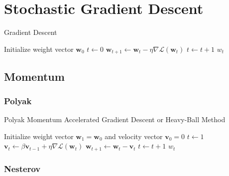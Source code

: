 \section{Stochastic Gradient Descent}

\begin{algorithm}[h!]
	\caption{Gradient Descent}
	\label{alg:gd}
	\begin{algorithmic}[1]
			\State Initialize weight vector $\textbf{w}_0$
			\State $t \gets 0$
				\State $\textbf{w}_{t+1} \gets \textbf{w}_t - \eta \nabla \mathcal{L}(\textbf{w}_t)$
				\State $t \gets t + 1$
			\EndWhile
			\State \Return $w_t$
		\EndFunction
	\end{algorithmic}
\end{algorithm}

\subsection{Momentum}



\subsubsection{Polyak}

\begin{algorithm}[h!]
	\caption{Polyak Momentum Accelerated Gradient Descent or Heavy-Ball Method}
	\label{alg:sgd}
	\begin{algorithmic}[1]
			\State Initialize weight vector $\textbf{w}_1 = \textbf{w}_0$ and velocity vector $\textbf{v}_0 = 0$
			\State $t \gets 1$
				\State $\textbf{v}_t \gets \beta \textbf{v}_{t-1} + \eta \nabla \mathcal{L}(\textbf{w}_t)$
				\State $\textbf{w}_{t+1} \gets \textbf{w}_t - \textbf{v}_t$
				\State $t \gets t + 1$
			\EndWhile
			\State \Return $w_t$
		\EndFunction
	\end{algorithmic}
\end{algorithm}

\subsubsection{Nesterov}

